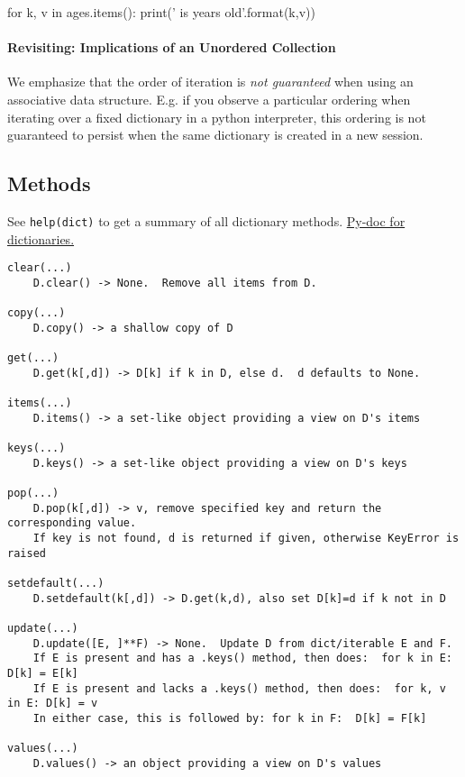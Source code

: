 \documentclass[12pt,letterpaper,twoside]{article}
\begin{document}
\begin{python}
for k, v in ages.items():
    print('{} is {} years old'.format(k,v))
\end{python}

\paragraph{Revisiting: Implications of an Unordered Collection}
We emphasize that the order of iteration is \emph{not guaranteed} when using an associative
data structure. E.g. if you observe a particular ordering when iterating over a fixed
dictionary in a python interpreter, this ordering is not guaranteed to persist when
the same dictionary is created in a new session.

\subsection{Methods}
See \texttt{help(dict)} to get a summary of all dictionary methods. \href{https://docs.python.org/3/tutorial/datastructures.html#dictionaries}{Py-doc for dictionaries.}

{
\footnotesize
\begin{verbatim}
clear(...)
    D.clear() -> None.  Remove all items from D.

copy(...)
    D.copy() -> a shallow copy of D

get(...)
    D.get(k[,d]) -> D[k] if k in D, else d.  d defaults to None.

items(...)
    D.items() -> a set-like object providing a view on D's items

keys(...)
    D.keys() -> a set-like object providing a view on D's keys

pop(...)
    D.pop(k[,d]) -> v, remove specified key and return the corresponding value.
    If key is not found, d is returned if given, otherwise KeyError is raised

setdefault(...)
    D.setdefault(k[,d]) -> D.get(k,d), also set D[k]=d if k not in D

update(...)
    D.update([E, ]**F) -> None.  Update D from dict/iterable E and F.
    If E is present and has a .keys() method, then does:  for k in E: D[k] = E[k]
    If E is present and lacks a .keys() method, then does:  for k, v in E: D[k] = v
    In either case, this is followed by: for k in F:  D[k] = F[k]

values(...)
    D.values() -> an object providing a view on D's values
\end{verbatim}
}
\end{document}
